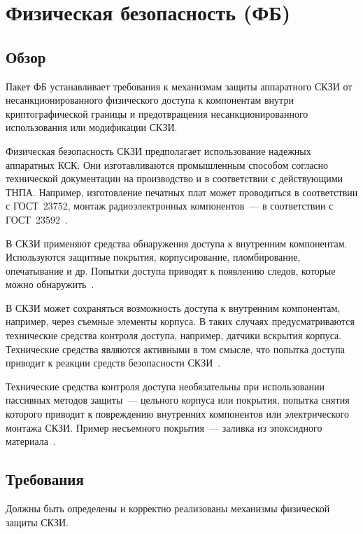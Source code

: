 \section{Физическая безопасность (ФБ)}\label{PS}

\subsection{Обзор}\label{PS.Intro}

Пакет ФБ устанавливает требования к механизмам защиты аппаратного СКЗИ 
от несанкционированного физического доступа к компонентам внутри 
криптографической границы и предотвращения несанкционированного использования 
или модификации СКЗИ.

Физическая безопасность СКЗИ предполагает использование надежных аппаратных 
КСК. Они изготавливаются промышленным способом согласно технической 
документации на производство и в соответствии с действующими ТНПА. 
%
Например, изготовление печатных плат может проводиться в соответствии с 
ГОСТ~23752, монтаж радиоэлектронных компонентов~--- в соответствии с 
ГОСТ~23592~.

В СКЗИ применяют средства обнаружения доступа к внутренним компонентам.
%
Используются защитные покрытия, корпусирование, пломбирование, опечатывание и др. 
%
Попытки доступа приводят к появлению следов, которые можно 
обнаружить~. 

В СКЗИ может сохраняться возможность доступа к внутренним компонентам,
например, через съемные элементы корпуса. В таких случаях предусматриваются
технические средства контроля доступа, например, датчики вскрытия корпуса.
%
Технические средства являются активными в том смысле, что попытка доступа
приводит к реакции средств безопасности СКЗИ~.

Технические средства контроля доступа необязательны при использовании пассивных
методов защиты~--- цельного корпуса или покрытия, попытка снятия которого 
приводит к повреждению внутренних компонентов или электрического монтажа СКЗИ. 
%
Пример несъемного покрытия~--- заливка из эпоксидного 
материала~.

\subsection{Требования}\label{PS.Reqs}

\label{R.PS.List}
Должны быть определены и корректно реализованы механизмы физической защиты СКЗИ. 

